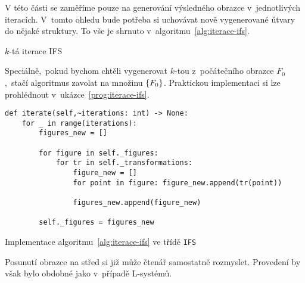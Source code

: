 V této části se zaměříme pouze na generování výsledného obrazce v~jednotlivých iteracích. V~tomto ohledu bude potřeba si uchovávat nově vygenerované útvary do nějaké struktury. To vše je shrnuto v~algoritmu~\ref{alg:iterace-ifs}.
\begin{algorithm}[h]
    \;
    \caption{$k$-tá iterace IFS}
    \label{alg:iterace-ifs}
\end{algorithm}
Speciálně,~pokud bychom chtěli vygenerovat $k$-tou z~počátečního obrazce $F_0$,~stačí algoritmus zavolat na množinu $\left\{F_0\right\}$. Praktickou implementaci si lze prohlédnout v~ukázce~\ref{prog:iterace-ifs}.
\begin{program}[h]
\begin{lstlisting}[style=python]
def iterate(self,~iterations: int) -> None:
    for _ in range(iterations):
        figures_new = []
        
        for figure in self._figures:
            for tr in self._transformations:
                figure_new = []
                for point in figure: figure_new.append(tr(point))

                figures_new.append(figure_new)
    
        self._figures = figures_new
\end{lstlisting}
    \caption{Implementace algoritmu~\ref{alg:iterace-ifs} ve třídě \texttt{IFS}}
    \label{prog:iterace-ifs}
\end{program}
Posunutí obrazce na střed si již může čtenář samostatně rozmyslet. Provedení by však bylo obdobné jako v~případě L-systémů.